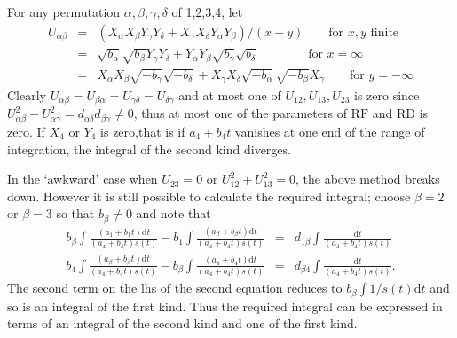 For any permutation $\alpha,\beta,\gamma,\delta$ of 1,2,3,4, let
\begin{eqnarray*}
U_{\alpha\beta} & = &(X_\alpha X_\beta Y_\gamma Y_\delta + X_\gamma X_\delta Y_\alpha Y_\beta)
  /(x-y) \qquad \mbox{for } x,y \mbox{ finite}\\
  & = & \sqrt{b_\alpha}\sqrt{b_\beta}Y_\gamma Y_\delta + Y_\alpha Y_\beta
  \sqrt{b_\gamma}\sqrt{b_\delta} \qquad \qquad \mbox{for } x = \infty\\
  & = & X_\alpha X_\beta \sqrt{-b_\gamma}\sqrt{-b_\delta}+X_\gamma X_\delta
      \sqrt{-b_\alpha}\sqrt{-b_\beta}X_\gamma \qquad \mbox{for } y = -\infty
\end{eqnarray*}
Clearly $U_{\alpha\beta}=U_{\beta\alpha}=U_{\gamma\delta}=U_{\delta\gamma}$ and at most
one of $U_{12}, U_{13}, U_{23}$ is zero since
$U_{\alpha\beta}^2 - U_{\alpha\gamma}^2 = d_{\alpha\delta}d_{\beta\gamma} \neq 0$, thus
at most one of the parameters of $\mathrm{RF}$ and $\mathrm{RD}$ is zero.
If $X_4$ or $Y_4$ is zero,that is if $a_4+b_4t$ vanishes at one end of the range
of integration, the integral of the second kind diverges.

In the `awkward' case when $U_{23}=0$ or $U_{12}^2+U_{13}^2=0$, the above method breaks
down. However it is still possible to calculate the required integral; choose
$\beta =2$ or $\beta=3$ so that $b_\beta \neq 0$ and note that
\begin{eqnarray*}
b_\beta\int \frac{(a_1+b_1t)\mathrm{d}t} {(a_4+b_4t)s(t)}
-b_1\int \frac{(a_\beta+b_\beta t)\mathrm{d}t}{(a_4+b_4t)s(t)}
&=& d_{1\beta}\int \frac{\mathrm{d}t}{(a_4+b_4t)s(t)} \\
b_4\int \frac{(a_\beta+b_\beta t)\mathrm{d}t}{(a_4+b_4t)s(t)}
-b_\beta\int\frac{(a_4+b_4 t)\mathrm{d}t}{(a_4+b_4t)s(t)}
&=& d_{\beta 4}\int \frac{\mathrm{d}t}{(a_4+b_4t)s(t)}.
\end{eqnarray*}
The second term on the lhs of the second equation reduces to
$b_\beta\int 1/s(t)\mathrm{d}t$ and so is an integral of the first kind.
Thus the required integral can be expressed in terms of an integral of the
second kind and one of the first kind.

